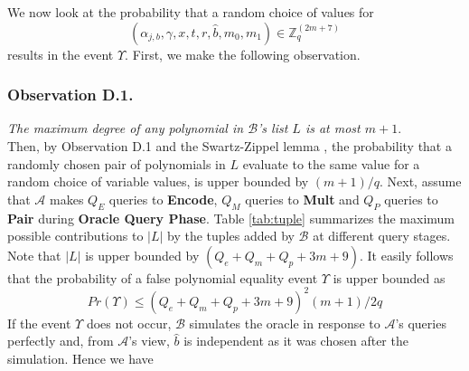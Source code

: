 \begin{table}[!t]
\centering
\captionsetup{font=scriptsize}
\caption{Upper Bounds on Contributions to Length of $L$}
\label{tab:tuple}
\end{table}

We now look at the probability that a random choice of values for
\begin{equation}
(\alpha_{j,b},\gamma,x,t,r,\hat{b},m_0,m_1)\in\mathbb{Z}^{\left(2m+7\right)}_q\nonumber
\end{equation}
\noindent results in the event $\Upsilon$. First, we make the following observation.

\subsubsection{Observation D.1.}\emph{The maximum degree of any polynomial in $\mathcal{B}$'s list $L$ is at most $m+1$}.\\

\noindent Then, by Observation D.1 and the Swartz-Zippel lemma \cite{moshkovitz2010alternative}, the probability that a randomly chosen pair of polynomials in $L$ evaluate to the same value for a random choice of variable values, is upper bounded by $(m+1)/q$. Next, assume that $\mathcal{A}$ makes $Q_E$ queries to \textbf{Encode}, $Q_M$ queries to \textbf{Mult} and $Q_P$ queries to \textbf{Pair} during \textbf{Oracle Query Phase}. Table \ref{tab:tuple} summarizes the maximum possible contributions to $|L|$ by the tuples added by $\mathcal{B}$ at different query stages. Note that $|L|$ is upper bounded by $(Q_e+Q_m+Q_p+3m+9)$. It easily follows that the probability of a false polynomial equality event $\Upsilon$ is upper bounded as
\begin{equation}
 Pr(\Upsilon)\leq \left(Q_e+Q_m+Q_p+3m+9\right)^2\left(m+1\right)/2q\nonumber
\end{equation}
\noindent If the event $\Upsilon$ does not occur, $\mathcal{B}$ simulates the oracle in response to $\mathcal{A}$'s queries perfectly and, from $\mathcal{A}$'s view, $\hat{b}$ is independent as it was chosen after the simulation. Hence we have 

